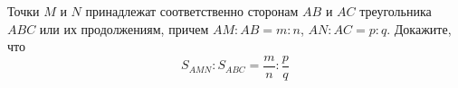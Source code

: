 \begin{ex}
	\begin{condition}
		Точки \( M \) и \( N \) принадлежат соответственно сторонам \( AB \) и \( AC \) треугольника \( ABC \) или их продолжениям, причем \( AM:AB=m:n \), \( AN:AC=p:q \). Докажите, что
		\[ S_{AMN}:S_{ABC}=\dfrac{m}{n}:\dfrac{p}{q} \]
	\end{condition}
\end{ex}